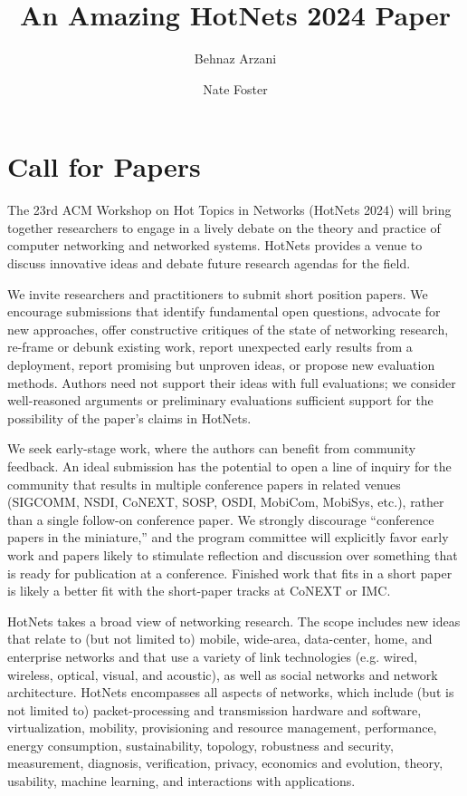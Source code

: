 \documentclass[sigconf,10pt,anonymous,review,nonacm]{acmart}
\title{An Amazing HotNets 2024 Paper}
\author{Behnaz Arzani}
\affiliation{%
  \institution{Microsoft Research}%
  \city{Redmond, WA}
  \country{USA}%
}
\author{Nate Foster}
\affiliation{%
  \institution{Cornell University}%
  \city{Ithaca, NY}
  \country{USA}%
}
\begin{document}
\maketitle

\section{Call for Papers}

The 23rd ACM Workshop on Hot Topics in Networks (HotNets 2024) will bring together researchers to engage in a lively debate on the theory and practice of computer networking and networked systems.  HotNets provides a venue to discuss innovative ideas and debate future research agendas for the field.

We invite researchers and practitioners to submit short position papers. We encourage submissions that identify fundamental open questions, advocate for new approaches, offer constructive critiques of the state of networking research, re-frame or debunk existing work, report unexpected early results from a deployment, report promising but unproven ideas, or propose new evaluation methods. Authors need not support their ideas with full evaluations; we consider well-reasoned arguments or preliminary evaluations sufficient support for the possibility of the paper’s claims in HotNets.

We seek early-stage work, where the authors can benefit from community feedback. An ideal submission has the potential to open a line of inquiry for the community that results in multiple conference papers in related venues (SIGCOMM, NSDI, CoNEXT, SOSP, OSDI, MobiCom, MobiSys, etc.), rather than a single follow-on conference paper. We strongly discourage ``conference papers in the miniature,'' and the program committee will explicitly favor early work and papers likely to stimulate reflection and discussion over something that is ready for publication at a conference. Finished work that fits in a short paper is likely a better fit with the short-paper tracks at CoNEXT or IMC.

HotNets takes a broad view of networking research. The scope includes new ideas that relate to (but not limited to) mobile, wide-area, data-center, home, and enterprise networks and that use a variety of link technologies (e.g. wired, wireless, optical, visual, and acoustic), as well as social networks and network architecture. HotNets encompasses all aspects of networks, which include (but is not limited to) packet-processing and transmission hardware and software, virtualization, mobility, provisioning and resource management, performance, energy consumption, sustainability, topology, robustness and security, measurement, diagnosis, verification, privacy, economics and evolution, theory, usability, machine learning, and interactions with applications.
\end{document}

